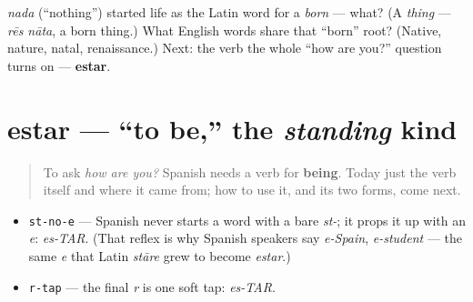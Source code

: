 \begin{tcolorbox}[breakable,colback=teal!4,colframe=teal!35!black,title={Before you move on}]
\emph{nada} (\textquotedblleft{}nothing\textquotedblright{}) started life as the Latin word for a \emph{born} — what? (A \emph{thing} — \emph{rēs nāta}, a born thing.) What English words share that \textquotedblleft{}born\textquotedblright{} root? (Native, nature, natal, renaissance.) Next: the verb the whole \textquotedblleft{}how are you?\textquotedblright{} question turns on — \textbf{estar}.
\end{tcolorbox}
\section[estar]{estar — \textquotedblleft{}to be,\textquotedblright{} the \emph{standing} kind}

\label{lesson:ES-C04-estar}



\begin{quote}
To ask \emph{how are you?} Spanish needs a verb for \textbf{being}. Today just the verb itself and where it came from; how to use it, and its two forms, come next.
\end{quote}

\begin{sounds}
\begin{itemize}
\raggedright
  \item \texttt{st-no-e} — Spanish never starts a word with a bare \emph{st-}; it props it up with an \emph{e}: \emph{es-TAR}. (That reflex is why Spanish speakers say \emph{e-Spain}, \emph{e-student} — the same \emph{e} that Latin \emph{stāre} grew to become \emph{estar}.)
  \item \texttt{r-tap} — the final \emph{r} is one soft tap: \emph{es-TAR}.
\end{itemize}
\end{sounds}

